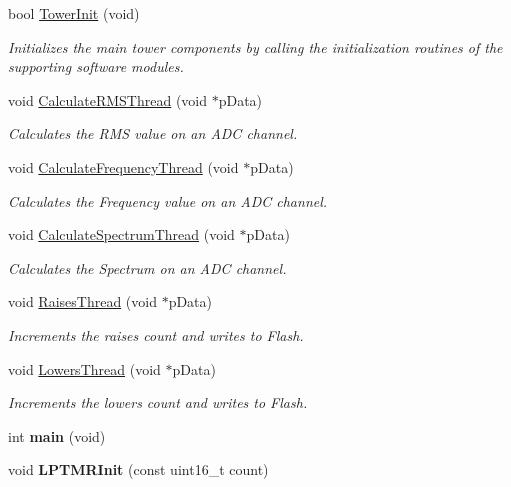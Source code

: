 \begin{DoxyCompactItemize}
bool \hyperlink{group__main__module_gaeda7b585d318b7b1476285b82b6fed11}{Tower\+Init} (void)
\begin{DoxyCompactList}\small\item\em Initializes the main tower components by calling the initialization routines of the supporting software modules. \end{DoxyCompactList}\item 
void \hyperlink{group__main__module_ga202b6a897d73aca5d3d20cde43ce7a54}{Calculate\+R\+M\+S\+Thread} (void $\ast$p\+Data)
\begin{DoxyCompactList}\small\item\em Calculates the R\+M\+S value on an A\+D\+C channel. \end{DoxyCompactList}\item 
void \hyperlink{group__main__module_ga39400542b35c71e63af9b23a072c2412}{Calculate\+Frequency\+Thread} (void $\ast$p\+Data)
\begin{DoxyCompactList}\small\item\em Calculates the Frequency value on an A\+D\+C channel. \end{DoxyCompactList}\item 
void \hyperlink{group__main__module_ga41af216646a8e64f0bc0767a77244c4c}{Calculate\+Spectrum\+Thread} (void $\ast$p\+Data)
\begin{DoxyCompactList}\small\item\em Calculates the Spectrum on an A\+D\+C channel. \end{DoxyCompactList}\item 
void \hyperlink{group__main__module_gad6f4e9bc8436aeebcc4776b05a7173ae}{Raises\+Thread} (void $\ast$p\+Data)
\begin{DoxyCompactList}\small\item\em Increments the raises count and writes to Flash. \end{DoxyCompactList}\item 
void \hyperlink{group__main__module_ga58206eaf11b86e19e48708e5d3e5cc3f}{Lowers\+Thread} (void $\ast$p\+Data)
\begin{DoxyCompactList}\small\item\em Increments the lowers count and writes to Flash. \end{DoxyCompactList}\item 
\hypertarget{group__main__module_ga840291bc02cba5474a4cb46a9b9566fe}{}int {\bfseries main} (void)\label{group__main__module_ga840291bc02cba5474a4cb46a9b9566fe}

\item 
\hypertarget{group__main__module_gaeac4abe1062c9f3b5d9eb540e300482a}{}void {\bfseries L\+P\+T\+M\+R\+Init} (const uint16\+\_\+t count)\label{group__main__module_gaeac4abe1062c9f3b5d9eb540e300482a}


\end{DoxyCompactItemize}
